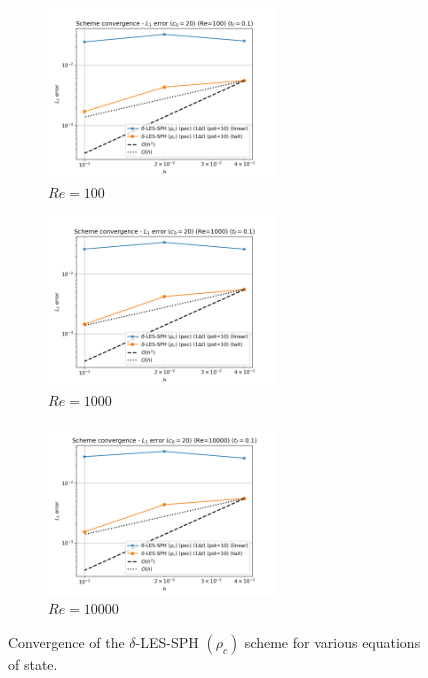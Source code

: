 \begin{figure}[htbp!]
  \begin{subfigure}{7cm}
    \centering\includegraphics[width=6cm]{Code-Figures/deltales/eos/dt_pois_conv_c0_20_re_100.png}
    \caption{$Re = 100$}
  \end{subfigure}
  \begin{subfigure}{7cm}
    \centering\includegraphics[width=6cm]{Code-Figures/deltales/eos/dt_pois_conv_c0_20_re_1000.png}
    \caption{$Re = 1000$}
  \end{subfigure}
  \begin{subfigure}{7cm}
    \centering\includegraphics[width=6cm]{Code-Figures/deltales/eos/dt_pois_conv_c0_20_re_10000.png}
    \caption{$Re = 10000$}
  \end{subfigure}
  \caption{Convergence of the $\delta$-LES-SPH $(\rho_c)$ scheme for various equations of state.}
  \label{fig:deltales-eos}
\end{figure}


